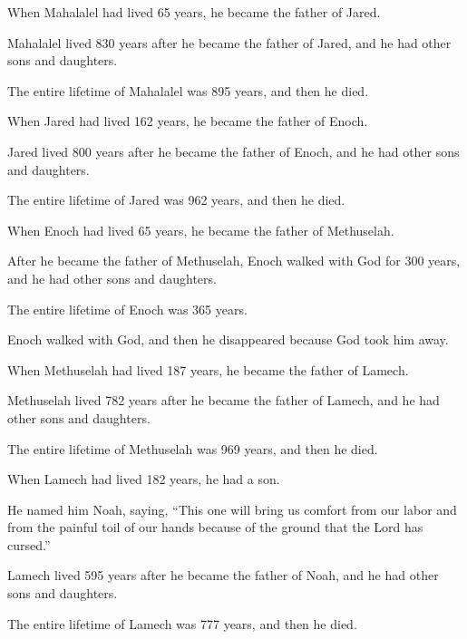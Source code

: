 \begin{scripture}
 When Mahalalel had lived 65 years, he became the father of Jared.
 Mahalalel lived 830 years after he became the father of Jared, and he had other sons and daughters.
 The entire lifetime of Mahalalel was 895 years, and then he died.
\everypar{}

 When Jared had lived 162 years, he became the father of Enoch.
 Jared lived 800 years after he became the father of Enoch, and he had other sons and daughters.
 The entire lifetime of Jared was 962 years, and then he died.
\everypar{}

 When Enoch had lived 65 years, he became the father of Methuselah.
 After he became the father of Methuselah, Enoch walked with God for 300 years, and he had other sons and daughters.
 The entire lifetime of Enoch was 365 years.
 Enoch walked with God, and then he disappeared because God took him away.
\everypar{}

 When Methuselah had lived 187 years, he became the father of Lamech.
 Methuselah lived 782 years after he became the father of Lamech, and he had other sons and daughters.
 The entire lifetime of Methuselah was 969 years, and then he died.
\everypar{}

 When Lamech had lived 182 years, he had a son.
 He named him Noah, saying, ``This one will bring us comfort from our labor and from the painful toil of our hands because of the ground that the Lord has cursed.''
 Lamech lived 595 years after he became the father of Noah, and he had other sons and daughters.
 The entire lifetime of Lamech was 777 years, and then he died.
\everypar{}


\end{scripture}
